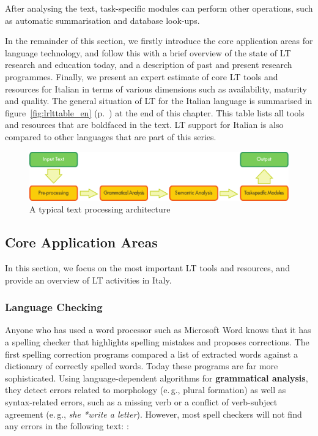 \begin{multicols}{2}
After analysing the text, task-specific modules can perform other operations,
such as automatic summarisation and database look-ups.

In the remainder of this section, we firstly introduce the core application areas for language technology, and follow this with a brief overview of the state of LT research and education today, and a description of past and present research programmes. Finally, we present an expert estimate of core LT tools and resources for Italian in terms of various dimensions such as availability, maturity and quality. The general situation of LT for the Italian language is summarised in figure~\ref{fig:lrlttable_en} (p.~\pageref{fig:lrlttable_en}) at the end of this chapter. This table lists all tools and resources that are boldfaced in the text. LT support for Italian is also compared to other languages that are part of this series.

\begin{figure}[htb]
  \center
  \includegraphics[width=\textwidth]{../_media/english/text_processing_app_architecture}
  \caption{A typical text processing architecture}
\label{fig:textprocessingarch_en}
\end{figure}

\subsection{Core Application Areas}

In this section, we focus on the most important LT tools and resources, and
provide an overview of LT activities in Italy. 

\subsubsection{Language Checking}

Anyone who has used a word processor such as Microsoft Word knows that it has a spelling checker that highlights spelling mistakes and proposes corrections. The first spelling correction programs compared a list of extracted words against a dictionary of correctly spelled words. Today these programs are far more sophisticated. Using language-dependent algorithms for \textbf{grammatical analysis}, they detect errors related to morphology (e.\,g., plural formation) as well as syntax-related errors, such as a missing verb or a conflict of verb-subject agreement (e.\,g., \emph{she *write a letter}). However, most spell checkers will not find any errors in the following text: \cite{zar1}:


\end{multicols}
